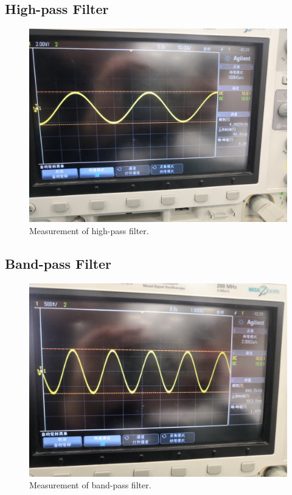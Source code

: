 \documentclass[a4paper]{report}
\begin{document}
\subsection{High-pass Filter}

\begin{figure}[H]
	\centering
	\includegraphics[width=0.8\linewidth]{10.jpg}
	\caption{Measurement of high-pass filter.}
\end{figure}
\subsection{Band-pass Filter}

\begin{figure}[H]
	\centering
	\includegraphics[width=0.8\linewidth]{11.jpg}
	\caption{Measurement of band-pass filter.}
\end{figure}
\end{document}
